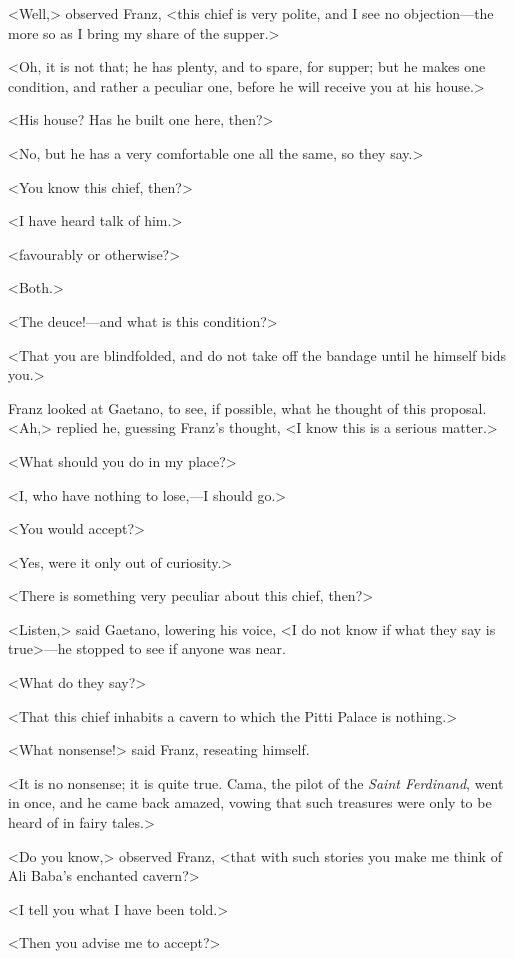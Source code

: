  <Well,> observed Franz, <this chief is very polite, and I see no objection—the more so as I bring my share of the supper.> 

 <Oh, it is not that; he has plenty, and to spare, for supper; but he makes one condition, and rather a peculiar one, before he will receive you at his house.> 

 <His house? Has he built one here, then?> 

 <No, but he has a very comfortable one all the same, so they say.> 

 <You know this chief, then?> 

 <I have heard talk of him.> 

 <favourably or otherwise?> 

 <Both.> 

 <The deuce!—and what is this condition?> 

 <That you are blindfolded, and do not take off the bandage until he himself bids you.> 

 Franz looked at Gaetano, to see, if possible, what he thought of this proposal. <Ah,> replied he, guessing Franz's thought, <I know this is a serious matter.> 

 <What should you do in my place?> 

 <I, who have nothing to lose,—I should go.>

<You would accept?> 

 <Yes, were it only out of curiosity.> 

 <There is something very peculiar about this chief, then?> 

 <Listen,> said Gaetano, lowering his voice, <I do not know if what they say is true>—he stopped to see if anyone was near. 

 <What do they say?> 

 <That this chief inhabits a cavern to which the Pitti Palace is nothing.> 

 <What nonsense!> said Franz, reseating himself. 

 <It is no nonsense; it is quite true. Cama, the pilot of the \textit{Saint Ferdinand}, went in once, and he came back amazed, vowing that such treasures were only to be heard of in fairy tales.> 

 <Do you know,> observed Franz, <that with such stories you make me think of Ali Baba's enchanted cavern?> 

 <I tell you what I have been told.> 

 <Then you advise me to accept?> 

